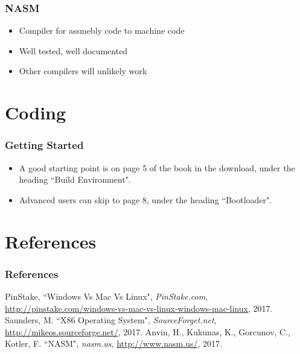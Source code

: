 \documentclass[10pt]{beamer}
\begin{document}
  \begin{frame}
    \frametitle{NASM}
    \begin{itemize}
      \item Compiler for assmebly code to machine code
      \item Well tested, well documented
      \item Other compilers will unlikely work
    \end{itemize}
  \end{frame}
  \section[Code]{Coding}
  \begin{frame}
    \frametitle{Getting Started}
    \begin{itemize}
      \item A good starting point is on page 5 of the book in the download,
        under the heading ``Build Environment".
      \item Advanced users can skip to page 8, under the heading ``Bootloader".
    \end{itemize}
  \end{frame}
  \section[Reff]{References}
  \begin{frame}
    \frametitle{References}
    \begin{thebibliography}{}
        PinStake,
        ``Windows Vs Mac Vs Linux",
        \emph{PinStake.com},
        \url{http://pinstake.com/windows-vs-mac-vs-linux-windows-mac-linux},
        2017.
        Saunders, M.
        ``X86 Operating System",
        \emph{SourceForget.net},
        \url{http://mikeos.sourceforge.net/},
        2017.
        Anvin, H.,
        Kukunas, K.,
        Gorcunov, C.,
        Kotler, F.
        ``NASM",
        \emph{nasm.us},
        \url{http://www.nasm.us/},
        2017.
    \end{thebibliography}
  \end{frame}
\end{document}

